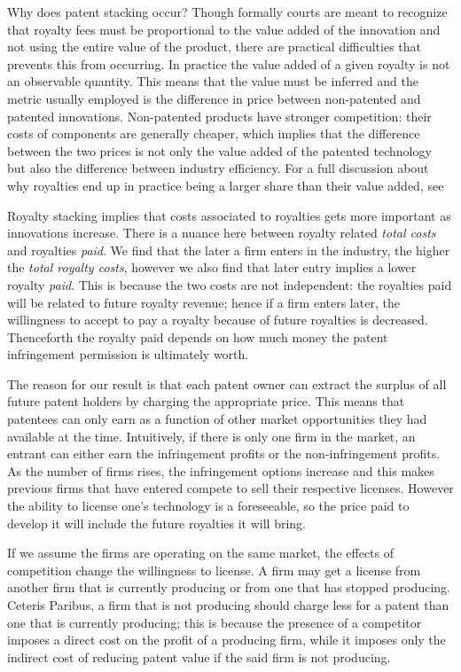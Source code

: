 \documentclass{article}
\begin{document}
Why does patent stacking occur? Though formally courts are meant to recognize that royalty fees must be proportional to the value added of the innovation and not using the entire value of the product, there are practical difficulties that prevents this from occurring. In practice the value added of a given royalty is not an observable quantity. This means that the value must be inferred and the metric usually employed is the difference in price between non-patented and patented innovations. Non-patented products have stronger competition: their costs of components are generally cheaper, which implies that the difference between the two prices is not only the value added of the patented technology but also the difference between industry efficiency. For a full discussion about why royalties end up in practice being a larger share than their value added, see \cite{Elhauge2008}

Royalty stacking implies that costs associated to royalties gets more important as innovations increase. There is a nuance here between royalty related \textit{total costs} and royalties \textit{paid}. We find that the later a firm enters in the industry, the higher the \textit{total royalty costs}, however we also find that later entry implies a lower royalty \textit{paid}. This is because the two costs are not independent: the royalties paid will be related to future royalty revenue; hence if a firm enters later, the willingness to accept to pay a royalty because of future royalties is decreased. Thenceforth the royalty paid depends on how much money the patent infringement permission is ultimately worth. 

The reason for our result is that each patent owner can extract the surplus of all future patent holders by charging the appropriate price. This means that patentees can only earn as a function of other market opportunities they had available at the time. Intuitively, if there is only one firm in the market, an entrant can either earn the infringement profits or the non-infringement profits. As the number of firms rises, the infringement options increase and this makes previous firms that have entered compete to sell their respective licenses. However the ability to license one's technology is a foreseeable, so the price paid to develop it will include the future royalties it will bring. 

If we assume the firms are operating on the same market, the effects of competition change the willingness to license. A firm may get a license from another firm that is currently producing or from one that has stopped producing. Ceteris Paribus, a firm that is not producing should charge less for a patent than one that is currently producing; this is because the presence of a competitor imposes a direct cost on the profit of a producing firm, while it imposes only the indirect cost of reducing patent value if the said firm is not producing. 
\end{document}
